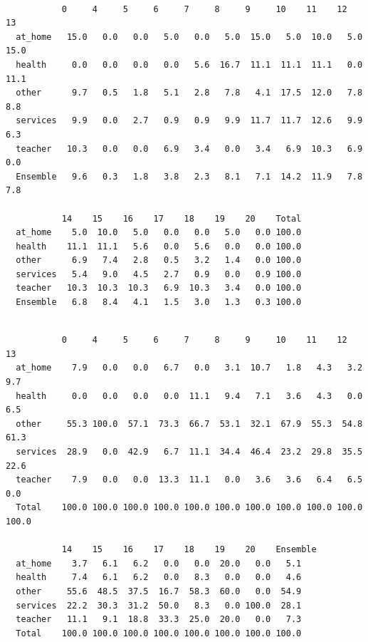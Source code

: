 \documentclass[
  letterpaper,
  DIV=11,
  numbers=noendperiod]{scrartcl}
\newenvironment{Shaded}{\begin{snugshade}}{\end{snugshade}}
\newcommand{\CommentTok}[1]{\textcolor[rgb]{0.37,0.37,0.37}{#1}}
\newcommand{\FunctionTok}[1]{\textcolor[rgb]{0.28,0.35,0.67}{#1}}
\newcommand{\NormalTok}[1]{\textcolor[rgb]{0.00,0.23,0.31}{#1}}
\newcommand{\SpecialCharTok}[1]{\textcolor[rgb]{0.37,0.37,0.37}{#1}}
\begin{document}
\begin{Shaded}
\end{Shaded}

\begin{verbatim}
          
           0     4     5     6     7     8     9     10    11    12    13   
  at_home   15.0   0.0   0.0   5.0   0.0   5.0  15.0   5.0  10.0   5.0  15.0
  health     0.0   0.0   0.0   0.0   5.6  16.7  11.1  11.1  11.1   0.0  11.1
  other      9.7   0.5   1.8   5.1   2.8   7.8   4.1  17.5  12.0   7.8   8.8
  services   9.9   0.0   2.7   0.9   0.9   9.9  11.7  11.7  12.6   9.9   6.3
  teacher   10.3   0.0   0.0   6.9   3.4   0.0   3.4   6.9  10.3   6.9   0.0
  Ensemble   9.6   0.3   1.8   3.8   2.3   8.1   7.1  14.2  11.9   7.8   7.8
          
           14    15    16    17    18    19    20    Total
  at_home    5.0  10.0   5.0   0.0   0.0   5.0   0.0 100.0
  health    11.1  11.1   5.6   0.0   5.6   0.0   0.0 100.0
  other      6.9   7.4   2.8   0.5   3.2   1.4   0.0 100.0
  services   5.4   9.0   4.5   2.7   0.9   0.0   0.9 100.0
  teacher   10.3  10.3  10.3   6.9  10.3   3.4   0.0 100.0
  Ensemble   6.8   8.4   4.1   1.5   3.0   1.3   0.3 100.0
\end{verbatim}

\begin{Shaded}
\end{Shaded}

\begin{verbatim}
          
           0     4     5     6     7     8     9     10    11    12    13   
  at_home    7.9   0.0   0.0   6.7   0.0   3.1  10.7   1.8   4.3   3.2   9.7
  health     0.0   0.0   0.0   0.0  11.1   9.4   7.1   3.6   4.3   0.0   6.5
  other     55.3 100.0  57.1  73.3  66.7  53.1  32.1  67.9  55.3  54.8  61.3
  services  28.9   0.0  42.9   6.7  11.1  34.4  46.4  23.2  29.8  35.5  22.6
  teacher    7.9   0.0   0.0  13.3  11.1   0.0   3.6   3.6   6.4   6.5   0.0
  Total    100.0 100.0 100.0 100.0 100.0 100.0 100.0 100.0 100.0 100.0 100.0
          
           14    15    16    17    18    19    20    Ensemble
  at_home    3.7   6.1   6.2   0.0   0.0  20.0   0.0   5.1   
  health     7.4   6.1   6.2   0.0   8.3   0.0   0.0   4.6   
  other     55.6  48.5  37.5  16.7  58.3  60.0   0.0  54.9   
  services  22.2  30.3  31.2  50.0   8.3   0.0 100.0  28.1   
  teacher   11.1   9.1  18.8  33.3  25.0  20.0   0.0   7.3   
  Total    100.0 100.0 100.0 100.0 100.0 100.0 100.0 100.0   
\end{verbatim}
\end{document}
